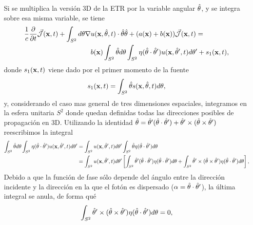 Si se multiplica la versión 3D de la ETR  por la variable angular $\hat{\theta}$, y se integra 
sobre esa misma variable, se tiene 
\begin{equation}
\begin{split}
\begin{aligned}
\frac{1}{c}\frac{\partial}{\partial t} \vec{ \mathcal{J}}(\mathbf{x},t)+\int_{S^2} d\theta \nabla & u(\mathbf{x},\hat{\theta},t) \cdot \hat{\theta} \hat{\theta} 
+(a(\mathbf{x})+b(\mathbf{x}))\vec{ \mathcal{J}}(\mathbf{x},t)=\\
&b(\mathbf{x})\int_{S^2} \hat{\theta} d\theta \int_{S^2} \eta(\hat{\theta} \cdot \hat{\theta}')  u(\mathbf{x},\hat{\theta}',t) d\theta' + s_1(\mathbf{x},t),
\end{aligned}
\end{split}
\label{eq:RTEjflux}
\end{equation}
donde $s_1(\mathbf{x},t)$ viene dado por el primer momento de la fuente
\begin{equation}
s_1(\mathbf{x},t)=\int_{S^2} \hat{\theta} s(\mathbf{x},\hat{\theta},t) d\theta,
\label{eq:RTEsflux1}
\end{equation}
y, considerando el caso mas general de tres dimensiones espaciales, integramos en la esfera unitaria $S^2$ donde quedan definidas todas las direcciones posibles de propagación en 3D. 
Utilizando la identidad $\hat{\theta}= \hat{\theta}'(\hat{\theta}\cdot \hat{\theta}') + \hat{\theta}' \times(\hat{\theta} \times \hat{\theta}')$ reescribimos la integral
\begin{equation}
\begin{split}
\begin{aligned}
\int_{S^2} \hat{\theta} d\theta \int_{S^2} \eta(\hat{\theta} \cdot \hat{\theta}')  u(\mathbf{x},\hat{\theta}',t) d\theta' 
&=\int_{S^2} u(\mathbf{x},\hat{\theta}',t) d\theta'  \int_{S^2} \hat{\theta} \eta(\hat{\theta} \cdot \hat{\theta}') d\theta\\
&=\int_{S^2} u(\mathbf{x},\hat{\theta}',t) d\theta' \left[  \int_{S^2} \hat{\theta}' (\hat{\theta} \cdot \hat{\theta}') \eta(\hat{\theta} \cdot \hat{\theta}') d\theta + \int_{S^2}  \hat{\theta}' \times(\hat{\theta} \times \hat{\theta}') \eta(\hat{\theta} \cdot \hat{\theta}') d\theta  \right],
\end{aligned}
\end{split}
\label{eq:RTEjint}
\end{equation}
Debido a que la función de fase sólo depende del ángulo entre 
la dirección incidente y la dirección en la que el fotón es dispersado ($\alpha=\hat{\theta} \cdot \hat{\theta}'$), la última integral se anula, de forma qué 
\begin{equation}
\begin{split}
\begin{aligned}
\int_{S^2}  \hat{\theta}' \times(\hat{\theta} \times \hat{\theta}') \eta(\hat{\theta} \cdot \hat{\theta}') d\theta =0,
\end{aligned}
\end{split}
\label{eq:RTEjint2}
\end{equation}
